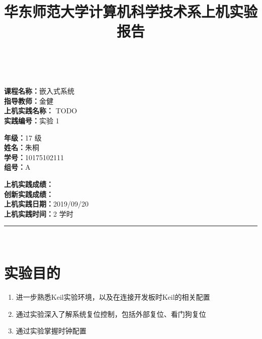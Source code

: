\documentclass[a4paper,10pt,UTF8]{paper}
\title{华东师范大学计算机科学技术系上机实验报告}
\numberwithin{equation}{section}
\numberwithin{figure}{section}
\begin{document}
\pagestyle{fancy}
\lhead{}
\rhead{}
\makeatletter
\def\headrule{{\if@fancyplain\let\headrulewidth\plainheadrulewidth\fi%
\color{gray}\hrule\@height 0.2pt\@width\headwidth}
  \vspace{6mm}}
\makeatother

\newcommand{\HRule}{\rule{\linewidth}{1mm}}
\newcommand{\dai}{\textbf{Dais-CMX16$^+$}}

{ \\ [0.8cm]

\small{
  \begin{minipage}[t]{.32\linewidth}
    \textbf{课程名称：}嵌入式系统\\
    \textbf{指导教师：}金健\\
    \textbf{上机实践名称：} TODO\\
    \textbf{实践编号：}实验 1
  \end{minipage}
  \begin{minipage}[t]{.32\linewidth}
    \textbf{年级：}17 级\\
    \textbf{姓名：}朱桐\\
    \textbf{学号：}10175102111\\
    \textbf{组号：}A
  \end{minipage} 
  \begin{minipage}[t]{.32\linewidth}
    \textbf{上机实践成绩：} \\
    \textbf{创新实践成绩：} \\
    \textbf{上机实践日期：}2019/09/20\\
    \textbf{上机实践时间：}2 学时\\
  \end{minipage}
}
\HRule \\[0.5cm]
}


\section{实验目的}

\begin{enumerate}
    \item 进一步熟悉Keil实验环境，以及在连接开发板时Keil的相关配置
    \item 通过实验深入了解系统复位控制，包括外部复位、看门狗复位
    \item 通过实验掌握时钟配置
\end{enumerate}
\end{document}
